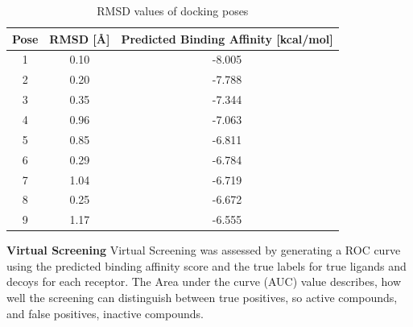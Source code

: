 \documentclass[a4paper,10pt]{article}
\begin{document}
\begin{table}[h!]
\centering
\caption{RMSD values of docking poses}
\label{tab:rmsd}
\begin{tabular}{|c|c|c|}
\hline
\textbf{Pose} & \textbf{RMSD [\AA]} & \textbf{Predicted Binding Affinity [kcal/mol]} \\
\hline
1 & 0.10 & -8.005\\
2 & 0.20 & -7.788\\
3 & 0.35 & -7.344\\
4 & 0.96 & -7.063\\
5 & 0.85 & -6.811\\
6 & 0.29 & -6.784 \\
7 & 1.04 & -6.719 \\
8 & 0.25 & -6.672\\
9 & 1.17 & -6.555 \\
\hline
\end{tabular}
\end{table}


\textbf{Virtual Screening}
Virtual Screening was assessed by generating a ROC curve using the predicted binding affinity score and the true labels for true ligands and decoys for each receptor. The Area under the curve (AUC) value describes, how well the screening can distinguish between true positives, so active compounds, and false positives, inactive compounds. 
\end{document}
